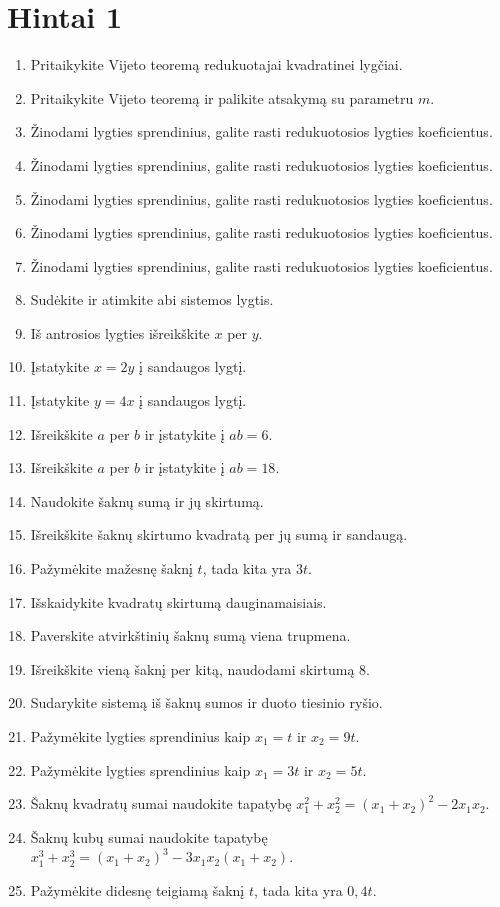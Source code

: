 \documentclass[11pt,a4paper]{scrartcl}
\begin{document}
\newpage
\section{Hintai 1}

\begin{enumerate}[label=\textbf{\arabic*.}, leftmargin=*]
    \item Pritaikykite Vijeto teoremą redukuotajai kvadratinei lygčiai.
    \item Pritaikykite Vijeto teoremą ir palikite atsakymą su parametru $m$.
    \item Žinodami lygties sprendinius, galite rasti redukuotosios lygties koeficientus.
    \item Žinodami lygties sprendinius, galite rasti redukuotosios lygties koeficientus.
    \item Žinodami lygties sprendinius, galite rasti redukuotosios lygties koeficientus.
    \item Žinodami lygties sprendinius, galite rasti redukuotosios lygties koeficientus.
    \item Žinodami lygties sprendinius, galite rasti redukuotosios lygties koeficientus.
    \item Sudėkite ir atimkite abi sistemos lygtis.
    \item Iš antrosios lygties išreikškite $x$ per $y$.
    \item Įstatykite $x=2y$ į sandaugos lygtį.
    \item Įstatykite $y=4x$ į sandaugos lygtį.
    \item Išreikškite $a$ per $b$ ir įstatykite į $ab=6$.
    \item Išreikškite $a$ per $b$ ir įstatykite į $ab=18$.
    \item Naudokite šaknų sumą ir jų skirtumą.
    \item Išreikškite šaknų skirtumo kvadratą per jų sumą ir sandaugą.
    \item Pažymėkite mažesnę šaknį $t$, tada kita yra $3t$.
    \item Išskaidykite kvadratų skirtumą dauginamaisiais.
    \item Paverskite atvirkštinių šaknų sumą viena trupmena.
    \item Išreikškite vieną šaknį per kitą, naudodami skirtumą $8$.
    \item Sudarykite sistemą iš šaknų sumos ir duoto tiesinio ryšio.
    \item Pažymėkite lygties sprendinius kaip $x_1=t$ ir $x_2= 9t$.
    \item Pažymėkite lygties sprendinius kaip $x_1=3t$ ir $x_2=5t$.
    \item Šaknų kvadratų sumai naudokite tapatybę $x_1^2+x_2^2=(x_1+x_2)^2-2x_1x_2$.
    \item Šaknų kubų sumai naudokite tapatybę $x_1^3+x_2^3=(x_1+x_2)^3-3x_1x_2(x_1+x_2)$.
    \item Pažymėkite didesnę teigiamą šaknį $t$, tada kita yra $0{,}4t$.
\end{enumerate}
\end{document}
